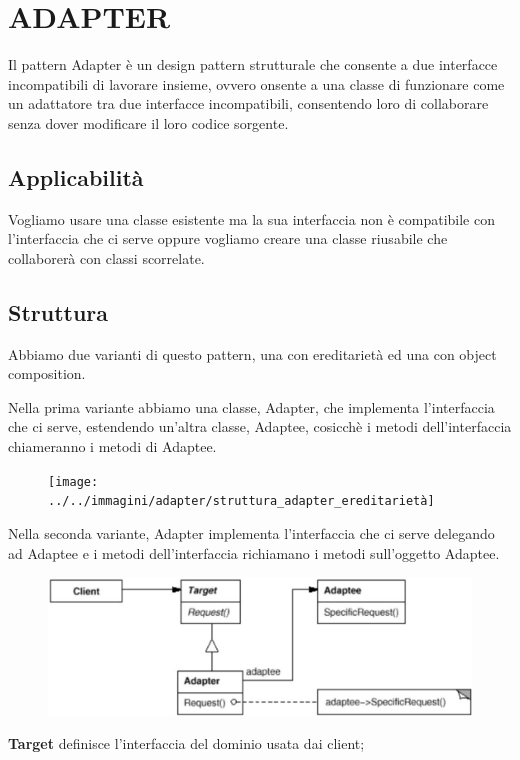 \chapter{ADAPTER}

Il pattern Adapter è un design pattern strutturale che consente a due interfacce incompatibili di lavorare insieme, ovvero onsente a una classe di funzionare come 
un adattatore tra due interfacce incompatibili, consentendo loro di collaborare senza dover modificare il loro codice sorgente.

\section{Applicabilità}

Vogliamo usare una classe esistente ma la sua interfaccia non è compatibile con l'interfaccia che ci serve oppure vogliamo creare una classe riusabile che collaborerà 
con classi scorrelate.

\section{Struttura}

Abbiamo due varianti di questo pattern, una con ereditarietà ed una con object composition.

Nella prima variante abbiamo una classe, Adapter, che implementa l'interfaccia che ci serve, estendendo un'altra classe, Adaptee, cosicchè i metodi dell'interfaccia 
chiameranno i metodi di Adaptee.

\begin{figure}[H]
    \centering
    \texttt{[image: ../../immagini/adapter/struttura\_adapter\_ereditarietà]}    
\end{figure}

Nella seconda variante, Adapter implementa l'interfaccia che ci serve delegando ad Adaptee e i metodi dell'interfaccia richiamano i metodi sull'oggetto Adaptee.

\begin{figure}[H]
    \centering
    \includegraphics[width=0.5\linewidth]{../../immagini/adapter/struttura_adapter_composition}
\end{figure}

\textbf{Target} definisce l'interfaccia del dominio usata dai client;

